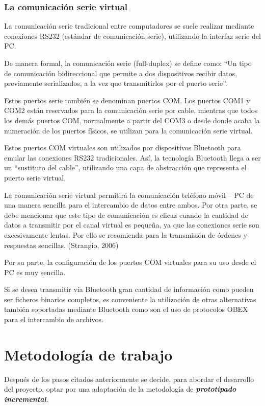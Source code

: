     \subsubsection{La comunicación serie virtual}
La comunicación serie tradicional entre computadores se suele realizar mediante
conexiones RS232 (estándar de comunicación serie), utilizando la interfaz serie 
del PC.

De manera formal, la comunicación serie (full-duplex) se define como:
``Un tipo de comunicación bidireccional que permite a dos dispositivos recibir
datos, previamente serializados, a la vez que transmitirlos por el puerto 
serie''.

Estos puertos serie también se denominan puertos COM. Los puertos COM1 y
COM2 están reservados para la comunicación serie por cable, mientras que todos 
los demás puertos COM, normalmente a partir del COM3 o desde donde acaba la 
numeración de los puertos físicos, se utilizan para la comunicación serie 
virtual.

Estos puertos COM virtuales son utilizados por dispositivos Bluetooth para 
emular las conexiones RS232 tradicionales. Así, la tecnología Bluetooth llega 
a ser un ``sustituto del cable'', utilizando una capa de abstracción que 
representa el puerto serie virtual.

La comunicación serie virtual permitirá la comunicación teléfono móvil – PC de
una manera sencilla para el intercambio de datos entre ambos. Por otra parte, 
se debe mencionar que este tipo de comunicación es eficaz cuando la cantidad 
de datos a transmitir por el canal virtual es pequeña, ya que las conexiones 
serie son excesivamente lentas. Por ello se recomienda para la transmisión de 
órdenes y respuestas sencillas. (Strangio, 2006)

Por su parte, la configuración de los puertos COM virtuales para su uso desde 
el PC es muy sencilla.

Si se desea transmitir vía Bluetooth gran cantidad de información como pueden 
ser ficheros binarios completos, es conveniente la utilización de otras 
alternativas también soportadas mediante Bluetooth como son el uso de 
protocolos OBEX para el intercambio de archivos.

\section{Metodología de trabajo}
\label{sec:workingMethodology}
Después de los pasos citados anteriormente se decide, para abordar el
desarrollo del proyecto, optar por una adaptación de la metodología de 
\emph{\textbf{prototipado incremental}}.

